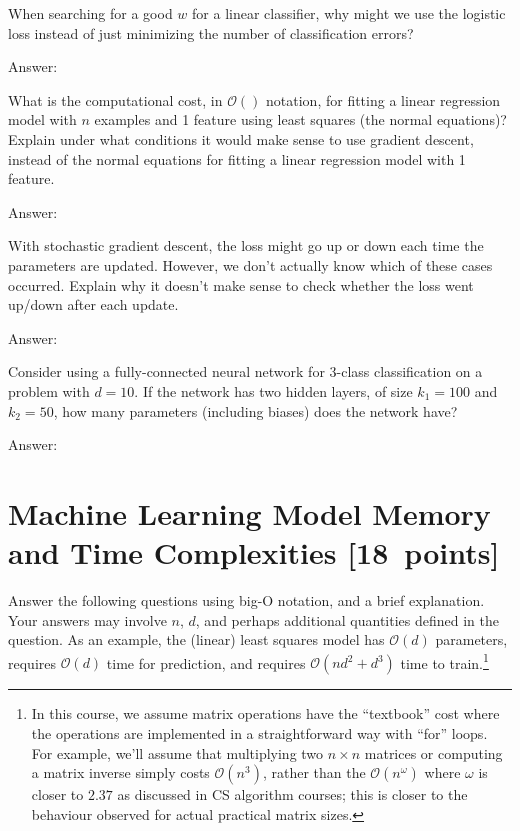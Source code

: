\documentclass{article}
\newcommand{\ask}[1]{\textcolor{question}{#1}}
\newenvironment{answer}{\par\begingroup\color{answer}Answer: }{\endgroup}
\newcommand{\pts}[1]{\textcolor{points}{[#1~points]}}
\newcommand{\TODO}{\color{red}{TODO}}
\newcommand{\bigO}{\mathcal{O}}
\begin{document}
\begin{qlist}
\item When searching for a good $w$ for a linear classifier, \ask{why might we use the logistic loss instead of just minimizing the number of classification errors?}
\begin{answer}\TODO\end{answer}

\item \ask{What is the computational cost}, in $\bigO()$ notation, for fitting a linear regression model with $n$ examples and 1 feature using least squares (the normal equations)? \ask{Explain under what conditions} it would make sense to use gradient descent, instead of the normal equations for fitting a linear regression model with 1 feature.
\begin{answer}\TODO\end{answer}


\item With stochastic gradient descent, the loss might go up or down each time the parameters are updated. However, we don't actually know which of these cases occurred. \ask{Explain why it doesn't make sense to check whether the loss went up/down after each update.}
\begin{answer}\TODO\end{answer}

\item Consider using a fully-connected neural network for 3-class classification on a problem with $d=10$. If the network has two hidden layers, of size $k_1=100$ and $k_2 = 50$, \ask{how many parameters (including biases) does the network have?}
\begin{answer}\TODO\end{answer}
\end{qlist}


\clearpage
\section{Machine Learning Model Memory and Time Complexities \pts{18}}


Answer the following questions using big-O notation, and a brief explanation.
Your answers may involve $n$, $d$, and perhaps additional quantities defined in the question. 
As an example, the (linear) least squares model has $\bigO(d)$ parameters, requires $\bigO(d)$ time for prediction, and requires $\bigO(nd^2 + d^3)$ time to train.\footnote{In this course, we assume matrix operations have the ``textbook'' cost where the operations are implemented in a straightforward way with ``for'' loops. For example, we'll assume that multiplying two $n \times n$ matrices or computing a matrix inverse simply costs $\bigO(n^3)$, rather than the $\bigO(n^\omega)$ where $\omega$ is closer to $2.37$ as discussed in CS algorithm courses; this is closer to the behaviour observed for actual practical matrix sizes.}
\end{document}
